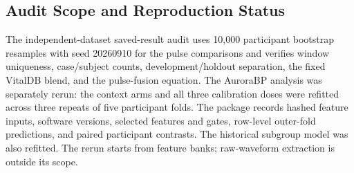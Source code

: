 \subsection{Audit Scope and Reproduction Status}
The independent-dataset saved-result audit uses 10,000 participant bootstrap resamples with seed 20260910 for the pulse comparisons and verifies window uniqueness, case/subject counts, development/holdout separation, the fixed VitalDB blend, and the pulse-fusion equation. The AuroraBP analysis was separately rerun: the context arms and all three calibration doses were refitted across three repeats of five participant folds. The package records hashed feature inputs, software versions, selected features and gates, row-level outer-fold predictions, and paired participant contrasts. The historical subgroup model was also refitted. The rerun starts from feature banks; raw-waveform extraction is outside its scope.
